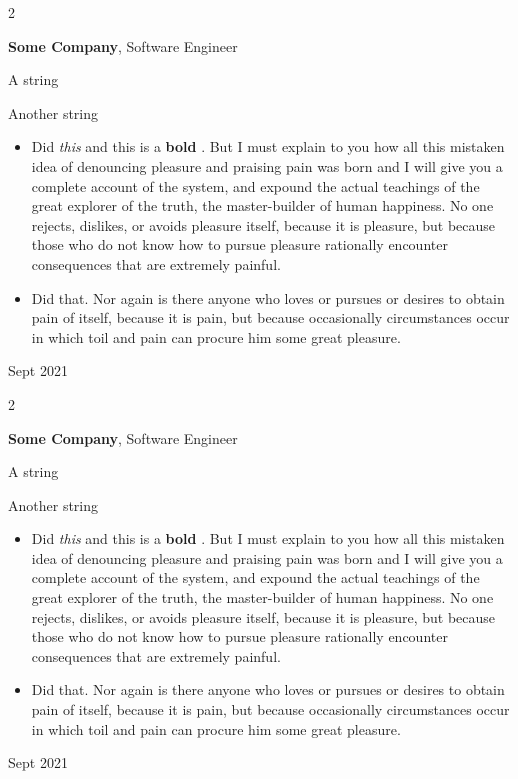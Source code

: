 \documentclass[10pt, letterpaper]{article}
\newenvironment{summary}{
    \begin{description}[
        topsep=0.10 cm,
        parsep=0.10 cm,
        partopsep=0pt,
        itemsep=0pt,
        leftmargin=0.4 cm + 10pt
    ]
}{
    \end{description}
} %
\newenvironment{highlights}{
    \begin{itemize}[
        topsep=0.10 cm,
        parsep=0.10 cm,
        partopsep=0pt,
        itemsep=0pt,
        leftmargin=0.4 cm + 10pt
    ]
}{
    \end{itemize}
} %
\newenvironment{twocolentry}[2][]{
    \onecolentry
    \def\secondColumn{#2}
    \setcolumnwidth{\fill, 4.5 cm}
    \begin{paracol}{2}
}{
    \switchcolumn \raggedleft \secondColumn
    \end{paracol}
    \endonecolentry
} %
\let\hrefWithoutArrow\href
\renewcommand{\href}[2]{\hrefWithoutArrow{#1}{\ifthenelse{\equal{#2}{}}{ }{#2 }\raisebox{.15ex}{\footnotesize \faExternalLink*}}}
\begin{document}
        \begin{twocolentry}{
            Sept 2021
        }
            \textbf{Some \textnormal{Company}}, Software Engineer
            \begin{summary}
                \item A string
                \item Another string
            \end{summary}
            \begin{highlights}
                \item Did \textit{this} and this is a \textbf{bold} \href{https://example.com}{link}. But I must explain to you how all this mistaken idea of denouncing pleasure and praising pain was born and I will give you a complete account of the system, and expound the actual teachings of the great explorer of the truth, the master-builder of human happiness. No one rejects, dislikes, or avoids pleasure itself, because it is pleasure, but because those who do not know how to pursue pleasure rationally encounter consequences that are extremely painful.
                \item Did that. Nor again is there anyone who loves or pursues or desires to obtain pain of itself, because it is pain, but because occasionally circumstances occur in which toil and pain can procure him some great pleasure.
            \end{highlights}
        \end{twocolentry}


        \vspace{0.2 cm}

        \begin{twocolentry}{
            Sept 2021
        }
            \textbf{Some \textnormal{Company}}, Software Engineer
            \begin{summary}
                \item A string
                \item Another string
            \end{summary}
            \begin{highlights}
                \item Did \textit{this} and this is a \textbf{bold} \href{https://example.com}{link}. But I must explain to you how all this mistaken idea of denouncing pleasure and praising pain was born and I will give you a complete account of the system, and expound the actual teachings of the great explorer of the truth, the master-builder of human happiness. No one rejects, dislikes, or avoids pleasure itself, because it is pleasure, but because those who do not know how to pursue pleasure rationally encounter consequences that are extremely painful.
                \item Did that. Nor again is there anyone who loves or pursues or desires to obtain pain of itself, because it is pain, but because occasionally circumstances occur in which toil and pain can procure him some great pleasure.
            \end{highlights}
        \end{twocolentry}
\end{document}
